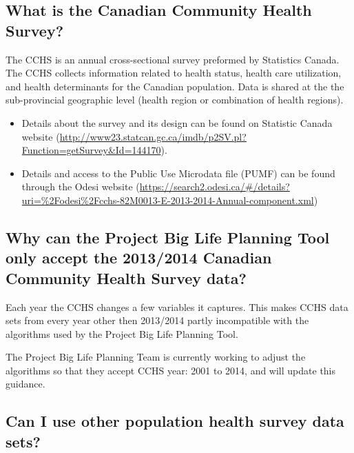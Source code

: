 \documentclass[]{book}
\providecommand{\tightlist}{%
  \setlength{\itemsep}{0pt}\setlength{\parskip}{0pt}}
\begin{document}
\hypertarget{what-is-the-canadian-community-health-survey}{%
\subsection{What is the Canadian Community Health Survey?}\label{what-is-the-canadian-community-health-survey}}

The CCHS is an annual cross-sectional survey preformed by Statistics Canada. The CCHS collects information related to health status, health care utilization, and health determinants for the Canadian population. Data is shared at the the sub-provincial geographic level (health region or combination of health regions).

\begin{itemize}
\tightlist
\item
  Details about the survey and its design can be found on Statistic Canada website (\url{http://www23.statcan.gc.ca/imdb/p2SV.pl?Function=getSurvey\&Id=144170}).
\item
  Details and access to the Public Use Microdata file (PUMF) can be found through the Odesi website (\url{https://search2.odesi.ca/\#/details?uri=\%2Fodesi\%2Fcchs-82M0013-E-2013-2014-Annual-component.xml})
\end{itemize}

\hypertarget{why-can-the-project-big-life-planning-tool-only-accept-the-20132014-canadian-community-health-survey-data}{%
\subsection{Why can the Project Big Life Planning Tool only accept the 2013/2014 Canadian Community Health Survey data?}\label{why-can-the-project-big-life-planning-tool-only-accept-the-20132014-canadian-community-health-survey-data}}

Each year the CCHS changes a few variables it captures. This makes CCHS data sets from every year other then 2013/2014 partly incompatible with the algorithms used by the Project Big Life Planning Tool.

The Project Big Life Planning Team is currently working to adjust the algorithms so that they accept CCHS year: 2001 to 2014, and will update this guidance.

\hypertarget{can-i-use-other-population-health-survey-data-sets}{%
\subsection{Can I use other population health survey data sets?}\label{can-i-use-other-population-health-survey-data-sets}}
\end{document}
